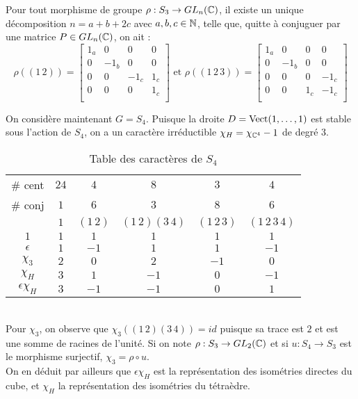 \documentclass{cours}
\begin{document}
\begin{proposition}
    Pour tout morphisme de groupe $\rho : S_{3} \to GL_{n}(\mathbb{C})$, il existe un unique décomposition $n = a + b + 2c$ avec $a, b, c \in \mathbb{N}$, telle que, quitte à conjuguer par une matrice $P \in GL_{n}(\mathbb{C})$, on ait :
    \[
        \rho((1\, 2)) = \begin{bmatrix}
            1_{a} & 0      & 0      & 0     \\
            0     & -1_{b} & 0      & 0     \\
            0     & 0      & -1_{c} & 1_{c} \\
            0     & 0      & 0      & 1_{c} \\
        \end{bmatrix}
        \text{ et }
        \rho ((1 \, 2 \, 3)) = \begin{bmatrix}
            1_{a} & 0      & 0     & 0      \\
            0     & -1_{b} & 0     & 0      \\
            0     & 0      & 0     & -1_{c} \\
            0     & 0      & 1_{c} & -1_{c} \\
        \end{bmatrix}
    \]
\end{proposition}

\begin{proposition}
    On considère maintenant $G = S_{4}$. Puisque la droite $D = \operatorname{Vect} (1, \ldots, 1)$ est stable sous l'action de $S_{4}$, on a un caractère irréductible $\chi_{H}  = \chi_{\mathbb{C}^{4}} - 1$ de degré $3$. 
    \begin{table}[ht]
        \centering
        \begin{tabular}{c|ccccc}
            \# cent & $24$ & $4$ & $8$ & $3$ & $4$\\
            \# conj & $1$ & $6$ & $3$ & $8$ & $6$\\
            & $1$ & $(1\, 2)$ & $(1\, 2)(3\, 4)$ & $(1\, 2 \, 3)$ & $(1\, 2\, 3\, 4)$\\
            \midrule
            $1$ & $1$ & $1$ & $1$ & $1$ & $1$\\
            $\epsilon$ & $1$ & $-1$ & $1$ & $1$ & $-1$\\
            $\chi_{3}$ & $2$ & $0$ & $2$ & $-1$ & $0$\\
            $\chi_{H}$ & $3$ & $1$ & $-1$ & $0$ & $-1$\\
            $\epsilon \chi_{H}$ & $3$ & $-1$ & $-1$ & $0$ & $1$
        \end{tabular}
        \caption{Table des caractères de $S_{4}$}
    \end{table}
    \\Pour $\chi_{3}$, on observe que $\chi_{3}((1\, 2)(3\, 4)) = id$ puisque sa trace est $2$ et est une somme de racines de l'unité. Si on note $\rho : S_{3} \rightarrow GL_{2}(\mathbb{C})$ et si $u : S_{4} \rightarrow S_3$ est le morphisme surjectif, $\chi_{3} = \rho \circ u$. \\ On en déduit par ailleurs que $\epsilon\chi_{H}$ est la représentation des isométries directes du cube, et $\chi_{H}$ la représentation des isométries du tétraèdre.
\end{proposition}
\end{document}
